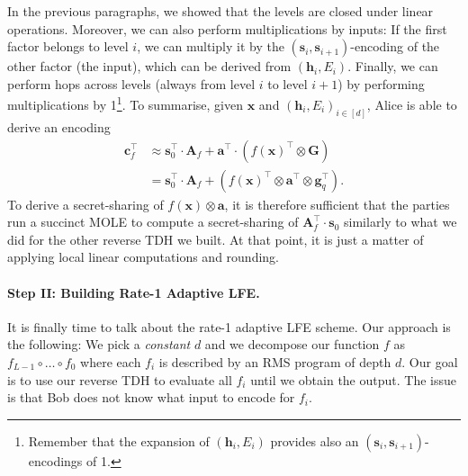 \documentclass{theoretics}
\begin{document}
In the previous paragraphs, we showed that the levels are closed under linear operations. Moreover, we can also perform multiplications by inputs: If the first factor belongs to level $i$, we can multiply it by the $(\mathbf{s}_i, \mathbf{s}_{i+1})$-encoding of the other factor (the input), which can be derived from $(\mathbf{h}_i, E_i)$. Finally, we can perform hops across levels (always from level $i$ to level $i+1$) by performing multiplications by 1\footnote{Remember that the expansion of $(\mathbf{h}_i, E_i)$ provides also an $(\mathbf{s}_i, \mathbf{s}_{i+1})$-encodings of 1.}. To summarise, given $\mathbf{x}$ and $(\mathbf{h}_i, E_i)_{i\in[d]}$, Alice is able to derive an encoding
\begin{align*}
    \mathbf{c}_f^\intercal&\approx \mathbf{s}_0^\intercal \cdot \mathbf{A}_f+\mathbf{a}^\intercal \cdot (f(\mathbf{x})^\intercal \otimes \mathbf{G})\\
    &=\mathbf{s}_0^\intercal \cdot \mathbf{A}_f+ (f(\mathbf{x})^\intercal \otimes \mathbf{a}^\intercal\otimes \mathbf{g}_q^\intercal).
\end{align*}
To derive a secret-sharing of $f(\mathbf{x}) \otimes \mathbf{a}$, it is therefore sufficient that the parties run a succinct MOLE to compute a secret-sharing of $\mathbf{A}_f^\intercal\cdot \mathbf{s}_0$ similarly to what we did for the other reverse TDH we built. At that point, it is just a matter of applying local linear computations and rounding.

\paragraph{Step II: Building Rate-1 Adaptive LFE.} It is finally time to talk about the rate-1 adaptive LFE scheme. Our approach is the following: We pick a \emph{constant} $d$ and we decompose our function $f$ as $f_{L-1}\circ\dots\circ f_0$ where each $f_i$ is described by an RMS program of depth $d$. Our goal is to use our reverse TDH to evaluate all $f_i$ until we obtain the output. The issue is that Bob does not know what input to encode for $f_i$. 
\end{document}
